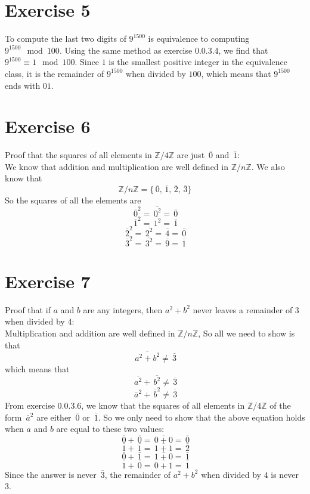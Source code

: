 \documentclass[12pt]{article}
\newcommand{\Z}{\mathbb{Z}}
\newcommand{\olsi}[1]{\,\overline{{#1}}}
\begin{document}
    \section*{Exercise 5}
    To compute the last two digits of $9^{1500}$
    is equivalence to computing $9^{1500} \mod 100$.
    Using the same method as exercise 0.0.3.4,
    we find that $9^{1500} \equiv 1 \mod 100$.
    Since $1$ is the smallest positive integer
    in the equivalence class,
    it is the remainder of $9^{1500}$ when divided by $100$,
    which means that $9^{1500}$ ends with $01$. \\

    \section*{Exercise 6}
    Proof that the squares of all elements in $\Z/4\Z$
    are just $\olsi{0}$ and $\olsi{1}$: \\
    We know that addition and multiplication are well defined
    in $\Z/n\Z$.
    We also know that
    \[\Z/n\Z = \{ \olsi{0}, \olsi{1}, \olsi{2}, \olsi{3} \}\]
    So the squares of all the elements are
    \[ \olsi{0}^2 = \olsi{0^2} = \olsi{0} \]
    \[ \olsi{1}^2 = \olsi{1^2} = \olsi{1} \]
    \[ \olsi{2}^2 = \olsi{2^2} = \olsi{4} = \olsi{0} \]
    \[ \olsi{3}^2 = \olsi{3^2} = \olsi{9} = \olsi{1} \]

    \section*{Exercise 7}
    Proof that if $a$ and $b$ are any integers,
    then $a^2 + b^2$ never leaves a remainder of $3$
    when divided by $4$: \\
    Multiplication and addition are well defined in $\Z/n\Z$,
    So all we need to show is that
    \[ \olsi{a^2 + b^2} \neq \olsi{3} \]
    which means that 
    \[ \olsi{a^2} + \olsi{b^2} \neq \olsi{3} \]
    \[ \olsi{a}^2 + \olsi{b}^2 \neq \olsi{3} \]
    From exercise 0.0.3.6,
    we know that the squares of all elements in $\Z/4\Z$
    of the form $\olsi{a}^2$
    are either $\olsi{0}$ or $\olsi{1}$.
    So we only need to show that the above equation
    holds when $a$ and $b$ are equal to these two values:
    \[ \olsi{0} + \olsi{0} = \olsi{0 + 0} = \olsi{0} \]
    \[ \olsi{1} + \olsi{1} = \olsi{1 + 1} = \olsi{2} \]
    \[ \olsi{0} + \olsi{1} = \olsi{1 + 0} = \olsi{1} \]
    \[ \olsi{1} + \olsi{0} = \olsi{0 + 1} = \olsi{1} \]
    Since the answer is never $\olsi{3}$,
    the remainder of $a^2 + b^2$ when divided by $4$
    is never $3$. \\
\end{document}
